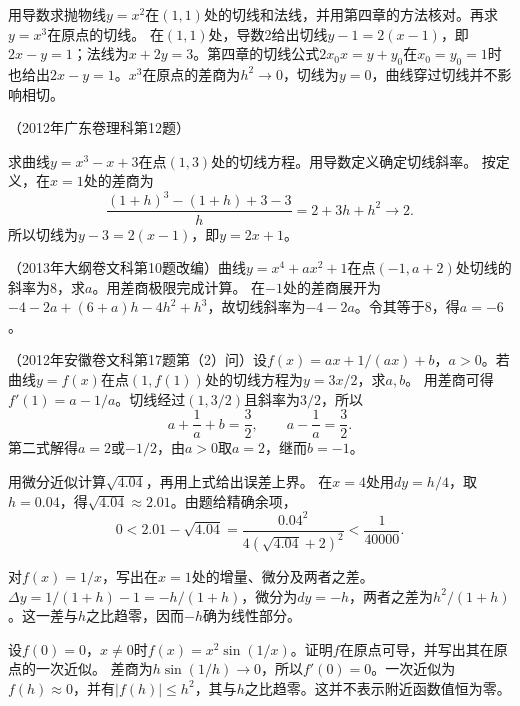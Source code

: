 用导数求抛物线\(y=x^2\)在\((1,1)\)处的切线和法线，并用第四章的方法核对。再求\(y=x^3\)在原点的切线。
\solutionanswer
在\((1,1)\)处，导数\(2\)给出切线\(y-1=2(x-1)\)，即\(2x-y=1\)；法线为\(x+2y=3\)。第四章的切线公式\(2x_0x=y+y_0\)在\(x_0=y_0=1\)时也给出\(2x-y=1\)。\(x^3\)在原点的差商为\(h^2\to0\)，切线为\(y=0\)，曲线穿过切线并不影响相切。


（2012年广东卷理科第12题）

求曲线\(y=x^3-x+3\)在点\((1,3)\)处的切线方程。用导数定义确定切线斜率。
\solutionanswer
按定义，在\(x=1\)处的差商为
\[
 \frac{(1+h)^3-(1+h)+3-3}{h}=2+3h+h^2\longrightarrow2.
\]
所以切线为\(y-3=2(x-1)\)，即\(y=2x+1\)。


（2013年大纲卷文科第10题改编）曲线\(y=x^4+ax^2+1\)在点\((-1,a+2)\)处切线的斜率为\(8\)，求\(a\)。用差商极限完成计算。
\solutionanswer
在\(-1\)处的差商展开为\(-4-2a+(6+a)h-4h^2+h^3\)，故切线斜率为\(-4-2a\)。令其等于\(8\)，得\(a=-6\)。


（2012年安徽卷文科第17题第（2）问）设\(f(x)=ax+1/(ax)+b\)，\(a>0\)。若曲线\(y=f(x)\)在点\((1,f(1))\)处的切线方程为\(y=3x/2\)，求\(a,b\)。
\solutionanswer
用差商可得\(f'(1)=a-1/a\)。切线经过\((1,3/2)\)且斜率为\(3/2\)，所以
\[
 a+\frac1a+b=\frac32,\qquad a-\frac1a=\frac32.
\]
第二式解得\(a=2\)或\(-1/2\)，由\(a>0\)取\(a=2\)，继而\(b=-1\)。


用微分近似计算\(\sqrt{4.04}\)，再用上式给出误差上界。
\solutionanswer
在\(x=4\)处用\(dy=h/4\)，取\(h=0.04\)，得\(\sqrt{4.04}\approx2.01\)。由题给精确余项，
\[
 0<2.01-\sqrt{4.04}
 =\frac{0.04^2}{4(\sqrt{4.04}+2)^2}<\frac1{40000}.
\]


对\(f(x)=1/x\)，写出在\(x=1\)处的增量、微分及两者之差。
\solutionanswer
\(\Delta y=1/(1+h)-1=-h/(1+h)\)，微分为\(dy=-h\)，两者之差为\(h^2/(1+h)\)。这一差与\(h\)之比趋零，因而\(-h\)确为线性部分。


设\(f(0)=0\)，\(x\ne0\)时\(f(x)=x^2\sin(1/x)\)。证明\(f\)在原点可导，并写出其在原点的一次近似。
\solutionanswer
差商为\(h\sin(1/h)\to0\)，所以\(f'(0)=0\)。一次近似为\(f(h)\approx0\)，并有\(|f(h)|\le h^2\)，其与\(h\)之比趋零。这并不表示附近函数值恒为零。


